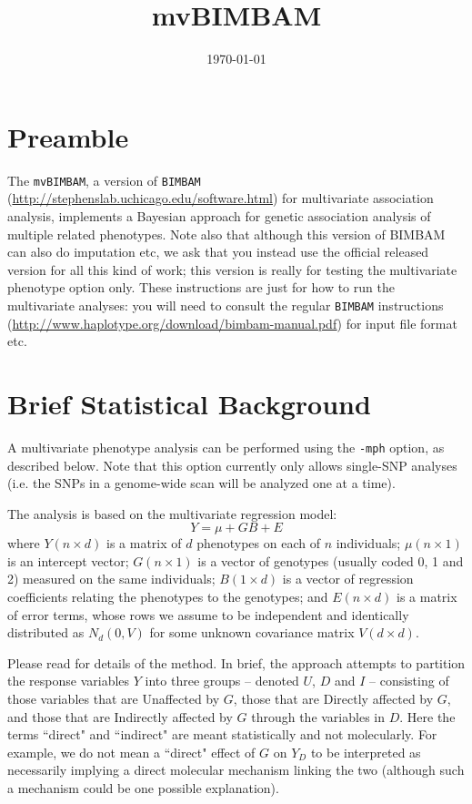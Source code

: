 \documentclass[11pt]{article}
\date{\today}
\def\I{I}
\def\U{U}
\def\D{D}
\begin{document}
\title{mvBIMBAM}

\maketitle


\section{Preamble}

The {\tt mvBIMBAM}, a version of {\tt BIMBAM} (\url{http://stephenslab.uchicago.edu/software.html}) \cite{Servin2007} for multivariate association analysis, implements a Bayesian approach for genetic association analysis of multiple related phenotypes. Note also that although this version of BIMBAM can also do imputation etc, we ask that you instead use the official released version for all this kind of work; this version is really for testing the multivariate phenotype option only. These instructions are just for how to run the multivariate analyses: you will need to consult the regular {\tt BIMBAM} instructions (\url{http://www.haplotype.org/download/bimbam-manual.pdf}) for input file format etc.

\section{Brief Statistical Background}

A multivariate phenotype analysis can be performed using the \verb+-mph+ option, as described below. Note that this option currently only allows single-SNP analyses (i.e. the SNPs in a genome-wide scan will be analyzed one at a time).

The analysis is based on the multivariate regression model:
\begin{equation} \label{Y.eqn}
Y = \mu+ G B+ E
\end{equation}
where $Y (n \times d)$ is a matrix of $d$ phenotypes on each of $n$ individuals; $\mu (n \times 1)$ is an intercept vector; $G (n \times 1)$ is a vector of genotypes (usually coded 0, 1 and 2) measured on the same individuals; $B (1 \times d)$ is a vector of regression coefficients relating the phenotypes to the genotypes; and
 $E (n \times d)$ is a matrix of error terms, whose rows we assume to be independent and identically distributed as $N_d(0,V)$ for some unknown covariance matrix $V (d \times d)$. 


Please read \cite{Stephens2013} for details of the method. 
In brief, the approach attempts to partition the response variables $Y$ into three groups -- denoted $\U$, $\D$ and $\I$ --  consisting of those variables that are Unaffected by $G$, those that are Directly affected by $G$, and those that are Indirectly affected by $G$ through the variables in $\D$.
Here the terms ``direct" and ``indirect" are meant statistically and not molecularly. For example, we do not mean a ``direct" effect of $G$ on $Y_D$ to be interpreted as necessarily implying a direct molecular mechanism linking the two (although such a mechanism could be one possible explanation).
\end{document}
